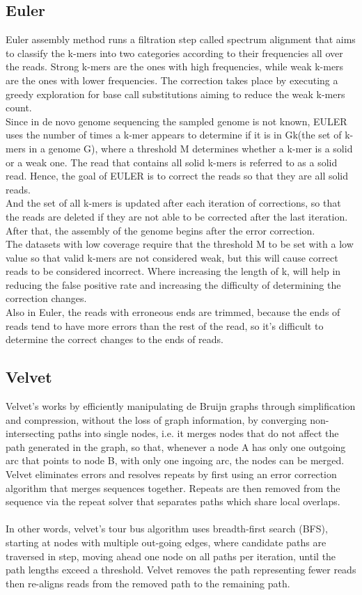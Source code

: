 \documentclass[12pt,openany]{llncs}
\begin{document}
\subsection{Euler}
Euler \cite{Euler} assembly method runs a filtration step called spectrum alignment that aims to classify the k-mers into two categories according to their frequencies all over the reads. Strong k-mers are the ones with high frequencies, while weak k-mers are the ones with lower frequencies. The correction takes place by executing a greedy exploration for base call substitutions aiming to reduce the weak k-mers count.
\\
Since in de novo genome sequencing the sampled genome is not known, EULER uses the number of times a k-mer appears to determine if it is in Gk(the set of k-mers in a genome G), where a threshold M determines whether a k-mer is a solid or a weak one. The read that contains all solid k-mers is referred to as a solid read. Hence, the goal of EULER is to correct the reads so that they are all solid reads.
\\
And the set of all k-mers is updated after each iteration of corrections, so that the reads are deleted if they are not able to be corrected after the last iteration. After that, the assembly of the genome begins after the error correction.
\\
The datasets with low coverage require that the threshold M to be set with a low value so that valid k-mers are not considered weak, but this will cause correct reads to be considered incorrect. 
Where increasing the length of k, will help in reducing the false positive rate and increasing the difficulty of determining the correction changes.
\\
Also in Euler, the reads with erroneous ends are trimmed, because the ends of reads tend to have more errors than the rest of the read, so it's difficult to determine the correct changes to the ends of reads.

\subsection{Velvet}
Velvet's \cite{Velvet} works by efficiently manipulating de Bruijn graphs through simplification and compression, without the loss of graph information, by converging non-intersecting paths into single nodes, i.e. it merges nodes that do not affect the path generated in the graph, so that, whenever a node A has only one outgoing arc that points to node B, with only one ingoing arc, the nodes can be merged.
\\
Velvet eliminates errors and resolves repeats by first using an error correction algorithm that merges sequences together. Repeats are then removed from the sequence via the repeat solver that separates paths which share local overlaps.
\\
\\
In other words, velvet's tour bus algorithm uses breadth-first search (BFS), starting at nodes with multiple out-going edges, where candidate paths are traversed in step, moving ahead one node on all paths per iteration, until the path lengths exceed a threshold. Velvet removes the path representing fewer reads then re-aligns reads from the removed path to the remaining path.
\end{document}
